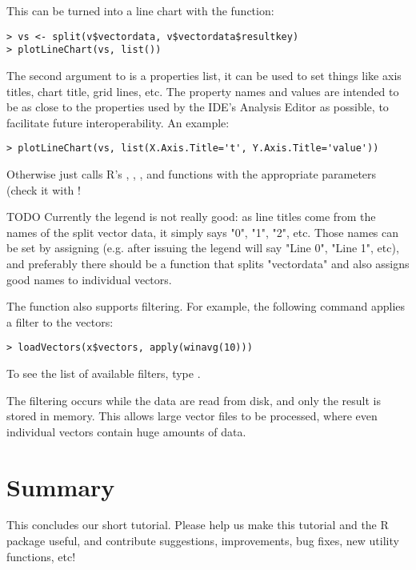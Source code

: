 This can be turned into a line chart with the  function:

\begin{verbatim}
> vs <- split(v$vectordata, v$vectordata$resultkey)
> plotLineChart(vs, list())
\end{verbatim}

The second argument to  is a properties list, it can be used
to set things like axis titles, chart title, grid lines, etc. The property names and 
values are intended to be as close to the properties used by the IDE's Analysis Editor 
as possible, to facilitate future interoperability. An example:

\begin{verbatim}
> plotLineChart(vs, list(X.Axis.Title='t', Y.Axis.Title='value'))
\end{verbatim}

Otherwise  just calls R's , , 
,  and  functions with the appropriate parameters
(check it with !

TODO Currently the legend is not really good: as line titles come from the names of
the split vector data, it simply says "0", "1", "2", etc. Those names can be set 
by assigning  (e.g. after issuing 
the legend will say "Line 0", "Line 1", etc), and preferably there should be a function
that splits "vectordata" and also assigns good names to individual vectors.

The  function also supports filtering. For example, the following
command applies a  filter to the vectors:

\begin{verbatim}
> loadVectors(x$vectors, apply(winavg(10)))
\end{verbatim}

To see the list of available filters, type .

The filtering occurs while the data are read from disk, and only the result is 
stored in memory. This allows large vector files to be processed, where even individual 
vectors contain huge amounts of data.


\section{Summary}

This concludes our short tutorial. Please help us make this tutorial and the R package useful,
and contribute suggestions, improvements, bug fixes, new utility functions, etc!



